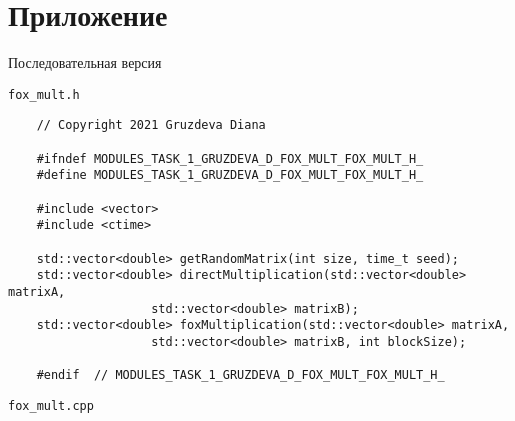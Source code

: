 \documentclass{article}
\begin{document}
\section*{Приложение}
\par
Последовательная версия
\par
\lstinline$fox_mult.h$
\begin{lstlisting}
	// Copyright 2021 Gruzdeva Diana

	#ifndef MODULES_TASK_1_GRUZDEVA_D_FOX_MULT_FOX_MULT_H_
	#define MODULES_TASK_1_GRUZDEVA_D_FOX_MULT_FOX_MULT_H_

	#include <vector>
	#include <ctime>

	std::vector<double> getRandomMatrix(int size, time_t seed);
	std::vector<double> directMultiplication(std::vector<double> matrixA,
                    std::vector<double> matrixB);
	std::vector<double> foxMultiplication(std::vector<double> matrixA,
                    std::vector<double> matrixB, int blockSize);

	#endif  // MODULES_TASK_1_GRUZDEVA_D_FOX_MULT_FOX_MULT_H_
\end{lstlisting}
\par
\lstinline$fox_mult.cpp$
\end{document}
